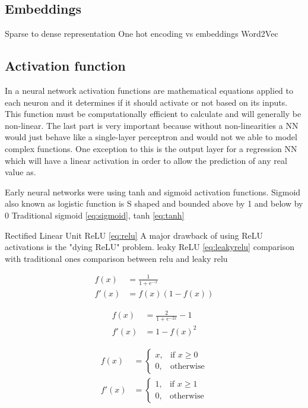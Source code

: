 \subsection{Embeddings}
Sparse to dense representation
One hot encoding vs embeddings
Word2Vec

\subsection{Activation function}
In a neural network activation functions are mathematical equations applied to each neuron and it determines if it should activate or not based on its inputs. This function must be computationally efficient to calculate and will generally be non-linear. The last part is very important because without non-linearities a NN would just behave like a single-layer perceptron and would not we able to model complex functions. One exception to this is the output layer for a regression NN which will have a linear activation in order to allow the prediction of any real value as.

Early neural networks were using tanh and sigmoid activation functions. Sigmoid also known as logistic function is S shaped and bounded above by 1 and below by 0 
Traditional sigmoid \ref{eq:sigmoid}, tanh \ref{eq:tanh}

Rectified Linear Unit ReLU \ref{eq:relu}
A major drawback of using ReLU activations is the "dying ReLU" problem.  
leaky ReLU \ref{eq:leakyrelu}
comparison with traditional ones
comparison between relu and leaky relu

\begin{equation}
    \label{eq:sigmoid}
    \begin{aligned}
    f(x) &= \frac{1}{1+e^{-x}} \\
    f'(x) &= f(x)(1 - f(x))
    \end{aligned}
\end{equation}

\begin{equation}
    \label{eq:tanh}
    \begin{aligned}
    f(x) &= \frac{2}{1+e^{-2x}} - 1 \\
    f'(x) &= 1 - f(x)^2
    \end{aligned}
\end{equation}

\begin{equation}
    \label{eq:relu}
    \begin{aligned}
    f(x) &=
    \begin{cases}
        x, & \text{if } x\geq 0 \\
        0, & \text{otherwise}
    \end{cases} \\
    f'(x) &=
    \begin{cases}
        1, & \text{if } x\geq 1 \\
        0, & \text{otherwise}
    \end{cases}
    \end{aligned}
\end{equation}

